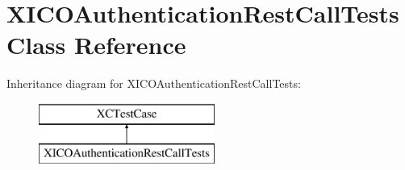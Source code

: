 \hypertarget{interface_x_i_c_o_authentication_rest_call_tests}{}\section{X\+I\+C\+O\+Authentication\+Rest\+Call\+Tests Class Reference}
\label{interface_x_i_c_o_authentication_rest_call_tests}
Inheritance diagram for X\+I\+C\+O\+Authentication\+Rest\+Call\+Tests\+:\begin{figure}[H]
\begin{center}
\leavevmode
\includegraphics[height=2.000000cm]{interface_x_i_c_o_authentication_rest_call_tests}
\end{center}
\end{figure}
